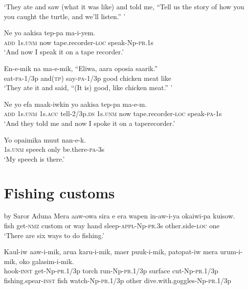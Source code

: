 \glt ‘They ate and saw (what it was like) and told me, “Tell us the story of how you you caught the turtle, and we’ll listen.” ’ \\
\z


\ea\label{ex:a:x6}
\gll  Ne  yo  aakisa  tep-pa  ma-i-yem. \\
\textsc{add}  1s.\textsc{unm}  now  tape.recorder-\textsc{loc}  speak-Np-\textsc{pr}.1s \\
\glt ‘And now I speak it on a tape recorder.’ \\
\z


\ea\label{ex:a:x7}
\gll  En-e-mik  na  ma-e-mik,  “Eliwa,  aara  oposia  saarik.” \\
eat-\textsc{pa}-1/3p  and(\textsc{tp})  say-\textsc{pa}-1/3p  good  chicken  meat  like \\
\glt ‘They ate it and said, “(It is) good, like chicken meat.” ’ \\
\z


\ea\label{ex:a:x8}
\gll  Ne  yo  efa  maak-iwkin  yo  aakisa       tep-pa  ma-e-m. \\
 \textsc{add}  1s.\textsc{unm}  1s.\textsc{acc}  tell-2/3p.\textsc{ds}  1s.\textsc{unm}  now  tape.recorder-\textsc{loc}  speak-\textsc{pa}-1s \\


\glt ‘And they told me and now I spoke it on a taperecorder.’ \\
\z


\ea\label{ex:a:x9}
\gll  Yo  opaimika  muut  nan-e-k. \\
1s.\textsc{unm}  speech  only  be.there-\textsc{pa}-3s \\
\glt ‘My speech is there.’ \\
\z


\setcounter{equation}{0}
\section{Fishing customs}
  by Saror Aduna
\ea\label{ex:a:x1}
\gll  Mera  aaw-owa  sira  e  era  wapen  in-aw-i-ya        okaiwi-pa  kuisow. \\
fish  get-\textsc{nmz}  custom  or  way  hand  sleep-\textsc{appl}-Np-\textsc{pr}.3s   other.side-\textsc{loc}  one \\


\glt ‘There are six ways to do fishing.’ \\
\z


\ea\label{ex:a:x2}
\gll  Kaul-iw  aaw-i-mik,  arua  karu-i-mik,     maer  puuk-i-mik,  patopat-iw  mera                urum-i-mik,  oko  galasim-i-mik. \\
hook-\textsc{inst}  get-Np-\textsc{pr}.1/3p  torch  run-Np-\textsc{pr}.1/3p surface  cut-Np-\textsc{pr}.1/3p  fishing.spear-\textsc{inst}  fish  watch-Np-\textsc{pr}.1/3p  other  dive.with.goggles-Np-\textsc{pr}.1/3p \\




